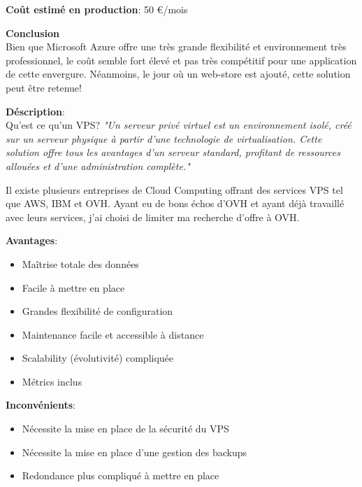 \newpara
\textbf{Coût estimé en production}: 50 €/mois

\newpara
\textbf{Conclusion} \\ Bien que Microsoft Azure offre une très grande flexibilité et environnement très professionnel, le coût semble fort élevé et pas très compétitif pour une application de cette envergure. Néanmoins, le jour où un web-store est ajouté, cette solution peut être retenue!

\newpage
{}

\textbf{Déscription}: \\ Qu'est ce qu'un VPS? \textit{"Un serveur privé virtuel est un environnement isolé, créé sur un serveur physique à partir d’une technologie de virtualisation. Cette solution offre tous les avantages d’un serveur standard, profitant de ressources allouées et d’une administration complète."}\cite{VPS}

\newpara
Il existe plusieurs entreprises de Cloud Computing offrant des services VPS tel que AWS, IBM et OVH. Ayant eu de bons échos d'OVH et ayant déjà travaillé avec leurs services, j'ai choisi de limiter ma recherche d'offre à OVH.

\newpara
\textbf{Avantages}:
\begin{itemize}
  \item Maîtrise totale des données
  \item Facile à mettre en place
  \item Grandes flexibilité de configuration
  \item Maintenance facile et accessible à distance
  \item Scalability (évolutivité) compliquée 
  \item Métrics inclus
\end{itemize}
  
\newpara
\textbf{Inconvénients}:
\begin{itemize}
  \item Nécessite la mise en place de la sécurité du VPS
  \item Nécessite la mise en place d'une gestion des backups
  \item Redondance plus compliqué à mettre en place
\end{itemize}

